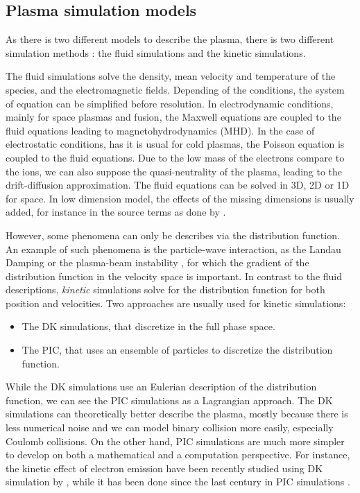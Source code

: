 \subsection*{Plasma simulation models} \label{subsec-simulations}
As there is two different models to describe the plasma, there is two different simulation methods : the fluid simulations and the kinetic simulations.

The fluid simulations solve the density, mean velocity and temperature of the species, and the electromagnetic fields.
Depending of the conditions, the system of equation can be simplified before resolution.
In electrodynamic conditions, mainly for space plasmas and fusion, the Maxwell equations are coupled to the fluid equations leading to magnetohydrodynamics (MHD).
In the case of electrostatic conditions, has it is usual for cold plasmas, the Poisson equation is coupled to the fluid equations.
Due to the low mass of the electrons compare to the ions, we can also suppose the quasi-neutrality of the plasma, leading to the drift-diffusion approximation.
The fluid equations can be solved in \ac{3D}, \ac{2D} or \ac{1D} for space.
In low dimension model, the effects of the missing dimensions is usually added, for instance in the source terms as done by \citet{barral2003a}.

However, some phenomena can only be describes via the distribution function.
An example of such phenomena is the particle-wave interaction, as the Landau Damping \citep{landau1945,malmberg1964} or the plasma-beam instability \citep{filippychev1990}, for which the gradient of the distribution function in the velocity space is important.
In contrast to the fluid descriptions, \emph{kinetic} simulations solve for the distribution function for both position and velocities.
Two approaches are usually used for kinetic simulations:
\begin{itemize}
  \item The \ac{DK} simulations, that discretize  in the full phase space.
  \item The \ac{PIC}, that uses an ensemble of particles to discretize the distribution function.
\end{itemize} 
While the \ac{DK} simulations use an Eulerian description of the distribution function, we can see the \ac{PIC} simulations as a Lagrangian approach.
The \ac{DK} simulations can theoretically better describe the plasma, mostly because there is less numerical noise and we can model binary collision more easily, especially Coulomb collisions.
On the other hand, \ac{PIC} simulations are much more simpler to develop on both a mathematical and a computation perspective.
For instance, the kinetic effect of electron emission have been recently studied using \ac{DK} simulation by \citet{cagas2019}, while it has been done since the last century in \ac{PIC} simulations \citep{boswell1988}.


